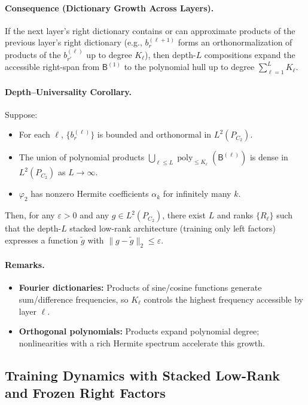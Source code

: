 \documentclass{article}
\begin{document}
\paragraph{Consequence (Dictionary Growth Across Layers).}
If the next layer's right dictionary contains or can approximate products of the previous layer's right dictionary (e.g., $b^{(\ell+1)}_r$ forms an orthonormalization of products of the $b^{(\ell)}_{r'}$ up to degree $K_\ell$), then depth-$L$ compositions expand the accessible right-span from $\mathsf{B}^{(1)}$ to the polynomial hull up to degree $\sum_{\ell=1}^L K_\ell$.

\paragraph{Depth--Universality Corollary.}
Suppose:
\begin{itemize}[leftmargin=1.5em]
    \item[(i)] For each $\ell$, $\{b_r^{(\ell)}\}$ is bounded and orthonormal in $L^2(P_{C_2})$.
    \item[(ii)] The union of polynomial products $\bigcup_{\ell\leq L} \operatorname{poly}_{\leq K_\ell}(\mathsf{B}^{(\ell)})$ is dense in $L^2(P_{C_2})$ as $L \to \infty$.
    \item[(iii)] $\varphi_2$ has nonzero Hermite coefficients $\alpha_k$ for infinitely many $k$.
\end{itemize}
Then, for any $\varepsilon>0$ and any $g\in L^2(P_{C_2})$, there exist $L$ and ranks $\{R_\ell\}$ such that the depth-$L$ stacked low-rank architecture (training only left factors) expresses a function $\tilde{g}$ with $\|g-\tilde{g}\|_2 \leq \varepsilon$.

\paragraph{Remarks.}
\begin{itemize}[leftmargin=1.5em]
    \item \textbf{Fourier dictionaries:} Products of sine/cosine functions generate sum/difference frequencies, so $K_\ell$ controls the highest frequency accessible by layer $\ell$.
    \item \textbf{Orthogonal polynomials:} Products expand polynomial degree; nonlinearities with a rich Hermite spectrum accelerate this growth.
\end{itemize}

\subsection{Training Dynamics with Stacked Low-Rank and Frozen Right Factors}
\end{document}
